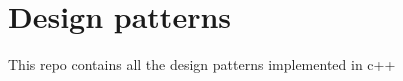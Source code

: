 \chapter{Design patterns}
\hypertarget{index}{}\label{index}
\label{index_md__2home_2sagar_2design__pattern_2README}%
%
 This repo contains all the design patterns implemented in c++ 